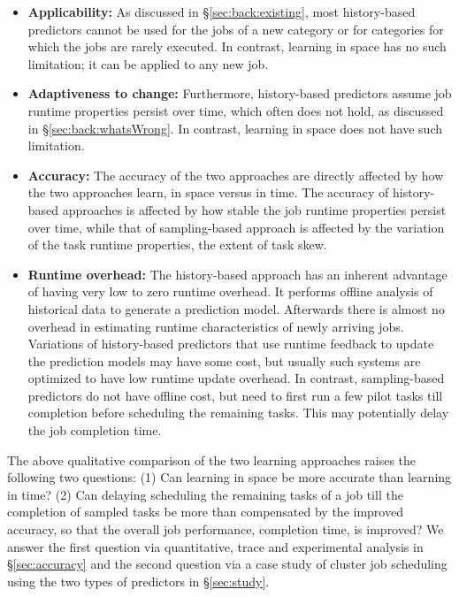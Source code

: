 \begin{itemize}%
\item {\bf Applicability:} As discussed in \S\ref{sec:back:existing}, most history-based
predictors cannot be used for the jobs of a new category or for categories
for which the jobs are rarely executed.  In contrast, learning in space
has no such limitation; it can be applied to any new job.
\item {\bf Adaptiveness to change:} Furthermore, history-based predictors assume
job runtime properties persist over time, which often does not hold, as discussed 
in \S\ref{sec:back:whatsWrong}. In contrast, learning in space does not have such 
limitation.
\item {\bf Accuracy:}
The accuracy of the two approaches are directly affected by
how the two approaches learn, \ie in space versus in time.
The accuracy of history-based approaches is affected by how stable
the job runtime properties persist over time, while that  of
sampling-based approach is affected by the variation of the task runtime properties,
\ie the extent of task skew.
%
\item {\bf Runtime overhead:} The history-based approach
has an inherent advantage of having very low to zero runtime
overhead. It performs offline analysis of historical data to generate
a prediction model.
\rm{Afterwards there is almost no overhead in
estimating runtime characteristics of newly arriving jobs. Variations
of history-based predictors that use runtime feedback to update the
prediction models may have some cost, but usually such systems are
optimized to have low runtime update overhead.}  In contrast,
sampling-based predictors do not have offline cost, but
need to first run a few pilot tasks till completion
before scheduling the remaining tasks. This may potentially
delay the job completion time.
\end{itemize}

The above qualitative comparison of the two learning approaches raises the
following two questions:
(1) Can learning in space be more accurate than learning in time?
(2) Can {delaying scheduling} the remaining tasks of a job till the completion
of sampled tasks be more than compensated by the improved accuracy, so that the
overall job performance, \eg completion time, is improved?
%
We answer the first question via quantitative, trace and experimental analysis
in \S\ref{sec:accuracy} and the second question via a case study of cluster job
scheduling using the two types of predictors in \S\ref{sec:study}.


